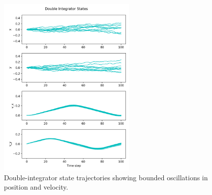 \documentclass [11pt]{article}
\begin{document}
\begin{enumerate}[label=(\roman*)]
        \begin{figure}[H]
            \centering
            \includegraphics[width=0.6\textwidth]{figs/p2_double_integrator_states.png}
            \caption{Double-integrator state trajectories showing bounded oscillations in position and velocity.}
            \label{fig:p2_di_state}
        \end{figure}

    \end{enumerate}
\end{document}
